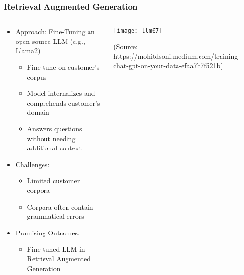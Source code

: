 \begin{frame}[fragile]\frametitle{Retrieval Augmented Generation}
\begin{columns}
    \begin{column}[T]{0.6\linewidth}
\begin{itemize}
    \item Approach: Fine-Tuning an open-source LLM (e.g., Llama2)
    \begin{itemize}
        \item Fine-tune on customer's corpus
        \item Model internalizes and comprehends customer's domain
        \item Answers questions without needing additional context
    \end{itemize}
    \item Challenges:
    \begin{itemize}
        \item Limited customer corpora
        \item Corpora often contain grammatical errors
    \end{itemize}
    \item Promising Outcomes:
    \begin{itemize}
        \item Fine-tuned LLM in Retrieval Augmented Generation
    \end{itemize}
\end{itemize}

    \end{column}
    \begin{column}[T]{0.4\linewidth}
\begin{center}
\texttt{[image: llm67]}
\end{center}
{\tiny (Source: https://mohitdsoni.medium.com/training-chat-gpt-on-your-data-efaa7b7f521b)}
    \end{column}
  \end{columns}
\end{frame}

